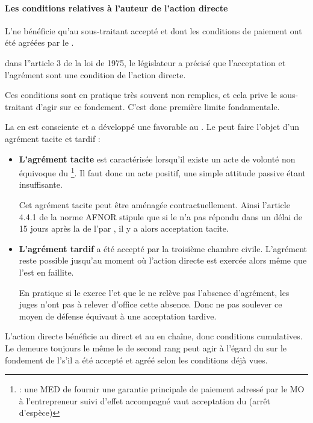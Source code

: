 			\paragraph{Les conditions relatives à l'auteur de l'action directe}

				L'\AD ne bénéficie qu’au sous-traitant accepté et dont les conditions de paiement ont été agréées par le \MO.

				dans l''article 3 de la loi de 1975, le législateur a précisé que l'acceptation et l'agrément sont une condition de l’action directe.

				Ces conditions sont en pratique très souvent non remplies, et cela prive le sous-traitant d’agir sur ce fondement. C’est donc première limite fondamentale.

				La \CourDeCas en est consciente et a développé une \JP favorable au \ST. Le \ST peut faire l’objet d’un agrément tacite et tardif
:
				\begin{itemize}
					\item \textbf{L’agrément tacite} est caractérisée lorsqu’il existe un acte de volonté non équivoque du \MO\footnote{ : une MED de fournir une garantie principale de paiement adressé par le MO à l’entrepreneur suivi d’effet accompagné \aVerifier vaut acceptation du \ST (arrêt d’espèce)}. Il faut donc un acte positif, une simple attitude passive étant insuffisante.

					Cet agrément tacite peut être aménagée contractuellement. Ainsi l'article 4.4.1 de la norme AFNOR stipule que si le \MO n’a pas répondu dans un délai de 15 jours après la \med de l'\ep par \LRAR, il y a alors acceptation tacite.

					\item \textbf{L'agrément tardif} a été accepté par la troisième chambre civile. L'agrément reste possible jusqu’au moment où l’action directe est exercée alors même que l’\ep est en faillite.

					En pratique si le \ST exerce l’\AD et que le \MO ne relève pas l’absence d’agrément, les juges n’ont pas à relever d’office cette absence. Donc ne pas soulever ce moyen de défense équivaut à une acceptation tardive.
				\end{itemize}

				L’action directe bénéficie au \ST direct et au \ST en chaîne, donc conditions cumulatives. Le \MO demeure toujours le même le \ST de second rang peut agir à l’égard du \MO sur le fondement de l’\AD s’il a été accepté et agréé selon les conditions déjà vues.


